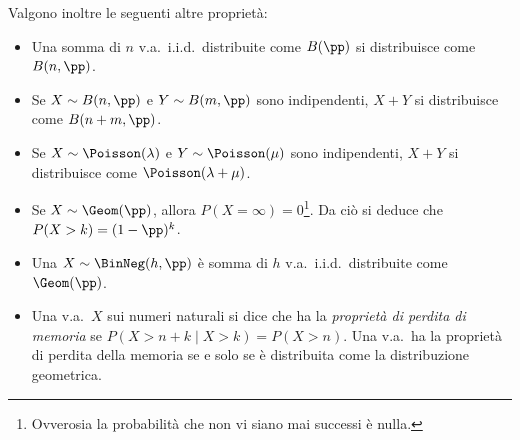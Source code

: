 \begin{landscape}
\begin{table}[htb]
{\begin{tabular}{|l|l|l|l|l|l|}
    \end{tabular}
}
\end{table}

Valgono inoltre le seguenti altre proprietà:

\small
\begin{itemize}
    \item Una somma di $n$ v.a.~i.i.d.~distribuite come $B(\pp)$ si
    distribuisce come $B(n, \pp)$.
    \item Se $X \sim B(n, \pp)$ e $Y \sim B(m, \pp)$ sono indipendenti, $X + Y$ si distribuisce come $B(n + m, \pp)$.
    \item Se $X \sim \Poisson(\lambda)$ e $Y \sim \Poisson(\mu)$ sono indipendenti,
    $X + Y$ si distribuisce come $\Poisson(\lambda + \mu)$.
    \item Se $X \sim \Geom(\pp)$, allora $P(X = \infty) = 0$\footnote{
        Ovverosia la probabilità che non vi siano mai successi è nulla.
    }. Da ciò si deduce che $P(X > k) = (1-\pp)^k$.
    \item Una $X \sim \BinNeg(h, \pp)$ è
    somma di $h$ v.a.~i.i.d.~distribuite
    come $\Geom(\pp)$.
    \item Una v.a.~$X$ sui numeri naturali si dice che ha la \textit{proprietà di perdita di memoria} se $P(X > n + k \mid X > k) = P(X > n)$. Una v.a.~ha
    la proprietà di perdita della memoria se e solo se è distribuita come
    la distribuzione geometrica.
\end{itemize}

\end{landscape}